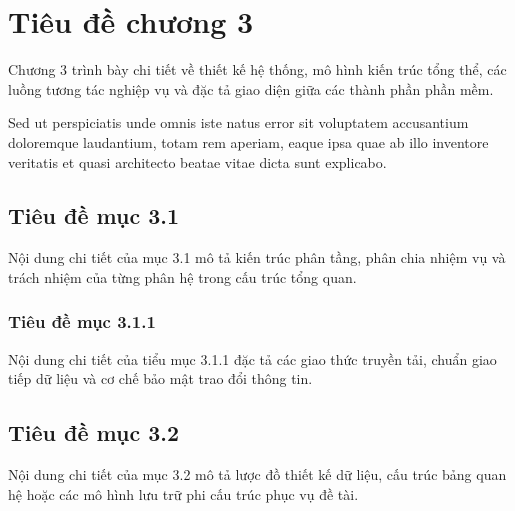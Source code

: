 
\chapter{Tiêu đề chương 3}
\label{chap:chapter_3}

Chương 3 trình bày chi tiết về thiết kế hệ thống, mô hình kiến trúc tổng thể, các luồng tương tác nghiệp vụ và đặc tả giao diện giữa các thành phần phần mềm.

Sed ut perspiciatis unde omnis iste natus error sit voluptatem accusantium doloremque laudantium, totam rem aperiam, eaque ipsa quae ab illo inventore veritatis et quasi architecto beatae vitae dicta sunt explicabo.

\section{Tiêu đề mục 3.1}
\label{sec:section_3_1}

Nội dung chi tiết của mục 3.1 mô tả kiến trúc phân tầng, phân chia nhiệm vụ và trách nhiệm của từng phân hệ trong cấu trúc tổng quan.

\subsection{Tiêu đề mục 3.1.1}
\label{subsec:subsection_3_1_1}

Nội dung chi tiết của tiểu mục 3.1.1 đặc tả các giao thức truyền tải, chuẩn giao tiếp dữ liệu và cơ chế bảo mật trao đổi thông tin.

\section{Tiêu đề mục 3.2}
\label{sec:section_3_2}

Nội dung chi tiết của mục 3.2 mô tả lược đồ thiết kế dữ liệu, cấu trúc bảng quan hệ hoặc các mô hình lưu trữ phi cấu trúc phục vụ đề tài.
